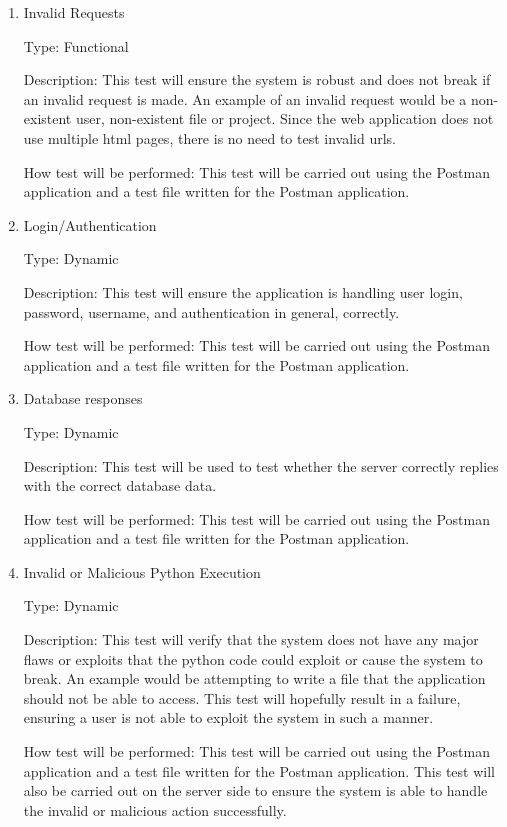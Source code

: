\documentclass[12pt, titlepage]{article}
\begin{document}
\begin{enumerate}

\item{Invalid Requests\\}

Type: Functional
					
Description: This test will ensure the system is robust and does not break
if an invalid request is made. An example of an invalid request would be a
non-existent user, non-existent file or project. Since the web application
does not use multiple html pages, there is no need to test invalid urls.

How test will be performed: This test will be carried out using the Postman
application and a test file written for the Postman application.

\item{Login/Authentication\\}

Type: Dynamic
					
Description: This test will ensure the application is handling user login,
password, username, and authentication in general, correctly.

How test will be performed: This test will be carried out using the Postman
application and a test file written for the Postman application.

\item{Database responses\\}

Type: Dynamic
					
Description: This test will be used to test whether the server correctly
replies with the correct database data. 

How test will be performed: This test will be carried out using the Postman
application and a test file written for the Postman application.

\item{Invalid or Malicious Python Execution\\}

Type: Dynamic
					
Description: This test will verify that the system does not have any major
flaws or exploits that the python code could exploit or cause the system to
break. An example would be attempting to write a file that the application
should not be able to access. This test will hopefully result in a failure,
ensuring a user is not able to exploit the system in such a manner.

How test will be performed: This test will be carried out using the Postman
application and a test file written for the Postman application. This test will
also be carried out on the server side to ensure the system is able to handle
the invalid or malicious action successfully.


\end{enumerate}
\end{document}
